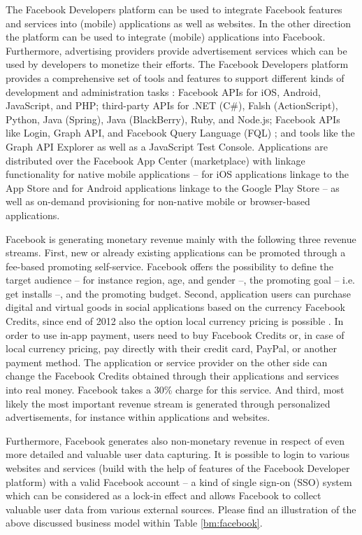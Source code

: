 The Facebook Developers platform can be used to integrate Facebook features and services into (mobile) applications as well as websites. In the other direction the platform can be used to integrate (mobile) applications into Facebook. Furthermore, advertising providers provide advertisement services which can be used by developers to monetize their efforts. The Facebook Developers platform provides a comprehensive set of tools and features to support different kinds of development and administration tasks \citep{Facebook2013a}: Facebook \acp{API} for iOS, Android, JavaScript, and PHP; third-party \acp{API} for .NET (C\#), Falsh (ActionScript), Python, Java (Spring), Java (BlackBerry), Ruby, and Node.js; Facebook \acp{API} like Login, Graph \ac{API}, and Facebook Query Language (FQL) ; and tools like the Graph \ac{API} Explorer as well as a JavaScript Test Console. Applications are distributed over the Facebook App Center (marketplace) with linkage functionality for native mobile applications -- for iOS applications linkage to the App Store and for Android applications linkage to the Google Play Store -- as well as on-demand provisioning for non-native mobile or browser-based applications.

Facebook is generating monetary revenue mainly with the following three revenue streams. First, new or already existing applications can be promoted through a fee-based promoting self-service. Facebook offers the possibility to define the target audience -- for instance region, age, and gender --, the promoting goal -- i.e. get installs --, and the promoting budget. Second, application users can purchase digital and virtual goods in social applications based on the currency Facebook Credits, since end of 2012 also the option local currency pricing is possible \citep{Facebook2013a}. In order to use in-app payment, users need to buy Facebook Credits or, in case of local currency pricing, pay directly with their credit card, PayPal, or another payment method. The application or service provider on the other side can change the Facebook Credits obtained through their applications and services into real money. Facebook takes a 30\% charge for this service. And third, most likely the most important revenue stream is generated through personalized advertisements, for instance within applications and websites.

Furthermore, Facebook generates also non-monetary revenue in respect of even more detailed and valuable user data capturing. It is possible to login to various websites and services (build with the help of features of the Facebook Developer platform) with a valid Facebook account -- a kind of single sign-on (SSO) system which can be considered as a lock-in effect and allows Facebook to collect valuable user data from various external sources. Please find an illustration of the above discussed business model within Table \ref{bm:facebook}.

